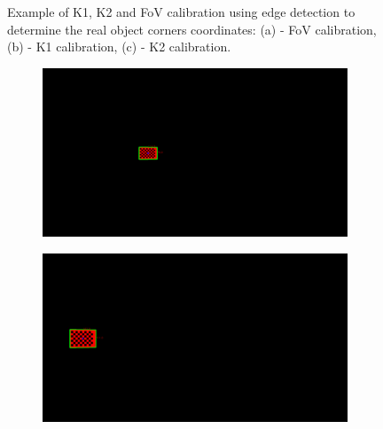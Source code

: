 \begin{figure}[h]
    \caption{Example of K1, K2 and \ac{FoV} calibration using edge detection to determine the real object corners coordinates: (a) - \ac{FoV} calibration, (b) - K1 calibration, (c) - K2 calibration.}
    \label{fig:fov_cal}
\end{figure}

\begin{figure}[h]
    \centering
    \begin{subfigure}[b]{0.45\textwidth}
        \includegraphics[width=\textwidth]{Images/04calibration/9.png}
        \caption{}
        \label{fig:a2}
    \end{subfigure}
    \hfill
    \begin{subfigure}[b]{0.45\textwidth}
        \includegraphics[width=\textwidth]{Images/04calibration/10.png}
        \caption{}
        \label{fig:b2}
    \end{subfigure}
    
    \vspace{0.5cm}
    

\end{figure}
